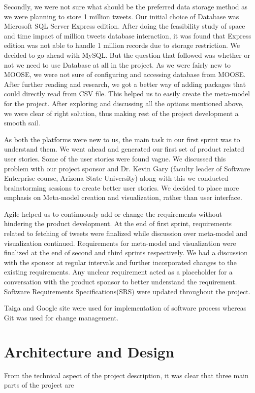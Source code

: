\documentclass[11pt]{article}
\begin{document}
Secondly, we were not sure what should be the preferred data storage method as we were planning to store 1 million tweets. Our initial choice of Database was Microsoft SQL Server Express edition. After doing the feasibility study of space and time impact of million tweets database interaction, it was found that Express edition was not able to handle 1 million records due to storage restriction. We decided to go ahead with MySQL. But the question that followed was whether or not we need to use Database at all in the project. As we were fairly new to MOOSE, we were not sure of configuring and accessing database from MOOSE. After further reading and research, we got a better way of adding packages that could directly read from CSV file. This helped us to easily create the meta-model for the project. After exploring and discussing all the options mentioned above, we were clear of right solution, thus making rest of the project development a smooth sail.  

As both the platforms were new to us, the main task in our first sprint was to understand them. We went ahead and generated our first set of product related user stories. Some of the user stories were found vague. We discussed this problem with our project sponsor and Dr. Kevin Gary (faculty leader of Software Enterprise course, Arizona State University) along with this we conducted brainstorming sessions to create better user stories. We decided to place more emphasis on Meta-model creation and visualization, rather than user interface. 

Agile helped us to continuously add or change the requirements without hindering the product development. At the end of first sprint, requirements related to fetching of tweets were finalized while discussion over meta-model and visualization continued. Requirements for meta-model and visualization were finalized at the end of second and third sprints respectively. We had a discussion with the sponsor at regular intervals and further incorporated changes to the existing requirements. Any unclear requirement acted as a placeholder for a conversation with the product sponsor to better understand the requirement. Software Requirements Specifications(SRS) were updated throughout the project.

Taiga\cite{TaigaSite} and Google site\cite{GoogleSite} were used for implementation of software process whereas Git was used for change management.


\section{Architecture and Design}
From the technical aspect of the project description\cite{SCOREwebsite}, it was clear that three main parts of the project are
\end{document}
